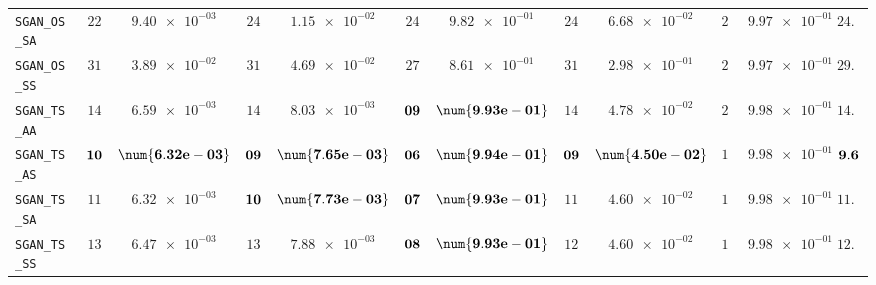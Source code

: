 \begin{xltabular}{\textwidth}{l||cC|cC|cC|cC|cC||c}
	\texttt{SGAN\_OS\_SA} & $ 22$ & $ \num{9.40e-03}$ & $ 24$ & $ \num{1.15e-02}$ & $ 24$ & $ \num{9.82e-01}$ & $ 24$ & $ \num{6.68e-02}$ & $ 28$ & $ \num{9.97e-01}$ & $ 24.4$  \\
	\texttt{SGAN\_OS\_SS} & $ 31$ & $ \num{3.89e-02}$ & $ 31$ & $ \num{4.69e-02}$ & $ 27$ & $ \num{8.61e-01}$ & $ 31$ & $ \num{2.98e-01}$ & $ 25$ & $ \num{9.97e-01}$ & $ 29.0$  \\
	\texttt{SGAN\_TS\_AA} & $ 14$ & $ \num{6.59e-03}$ & $ 14$ & $ \num{8.03e-03}$ & $\bf 09$ & $\bf \num{9.93e-01}$ & $ 14$ & $ \num{4.78e-02}$ & $ 20$ & $ \num{9.98e-01}$ & $ 14.2$  \\
	\texttt{SGAN\_TS\_AS} & $\bf 10$ & $\bf \num{6.32e-03}$ & $\bf 09$ & $\bf \num{7.65e-03}$ & $\bf 06$ & $\bf \num{9.94e-01}$ & $\bf 09$ & $\bf \num{4.50e-02}$ & $ 14$ & $ \num{9.98e-01}$ & $\bf 9.6$  \\
	\texttt{SGAN\_TS\_SA} & $ 11$ & $ \num{6.32e-03}$ & $\bf 10$ & $\bf \num{7.73e-03}$ & $\bf 07$ & $\bf \num{9.93e-01}$ & $ 11$ & $ \num{4.60e-02}$ & $ 18$ & $ \num{9.98e-01}$ & $ 11.4$  \\
	\texttt{SGAN\_TS\_SS} & $ 13$ & $ \num{6.47e-03}$ & $ 13$ & $ \num{7.88e-03}$ & $\bf 08$ & $\bf \num{9.93e-01}$ & $ 12$ & $ \num{4.60e-02}$ & $ 17$ & $ \num{9.98e-01}$ & $ 12.6$  \\ \midrule

\end{xltabular}

